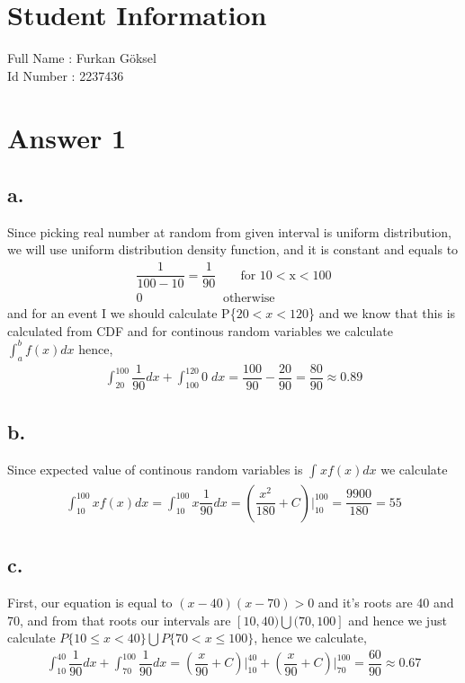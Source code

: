 \documentclass[12pt]{article}
\begin{document}
\section*{Student Information } 
Full Name : Furkan Göksel \\
Id Number : 2237436 \\

\section*{Answer 1}

\subsection*{a.}
Since picking real number at random from given interval is uniform distribution, we will use uniform distribution density function, and it is constant and equals to 
\begin{gather*} 
\dfrac{1}{100-10}=\dfrac{1}{90} \;\;\;\;\;\;\; \text{for 10$<$x$<$100} \\
0 \;\;\;\;\;\;\;\;\;\;\;\;\;\; \;\;\;\; \;\;\;\;\; \text{otherwise}
\end{gather*}
and for an event I we should calculate P\{$20<x<120$\} and we know that this is calculated from CDF and for continous random variables we calculate $\int_{a}^{b} f(x) dx$ hence,
\begin{gather*}
    \int_{20}^{100} \dfrac{1}{90} dx + \int_{100}^{120} 0 \; dx = \dfrac{100}{90}-\dfrac{20}{90} = \dfrac{80}{90} \approx 0.89
\end{gather*}
\subsection*{b.}
Since expected value of continous random variables is $\int_{}^{}xf(x) dx$ we calculate
\begin{gather*}
    \int_{10}^{100} xf(x) dx = \int_{10}^{100} x \dfrac{1}{90} dx = (\dfrac{x^2}{180} + C)\Big|_{10}^{100} = \dfrac{9900}{180} = 55
\end{gather*}
\subsection*{c.}
First, our equation is equal to $(x-40)(x-70)>0$ and it's roots are 40 and 70, and from that roots our intervals are $[10,40) \bigcup (70,100]$ and hence we just calculate $P\{10\leq x<40\} \bigcup P\{70<x\leq 100\}$, hence we calculate,
\begin{gather*}
\int_{10}^{40} \dfrac{1}{90}dx + \int_{70}^{100} \dfrac{1}{90}dx = (\dfrac{x}{90}+C)\Big|_{10}^{40}+(\dfrac{x}{90}+C)\Big|_{70}^{100} = \dfrac{60}{90} \approx 0.67
\end{gather*}
\end{document}
